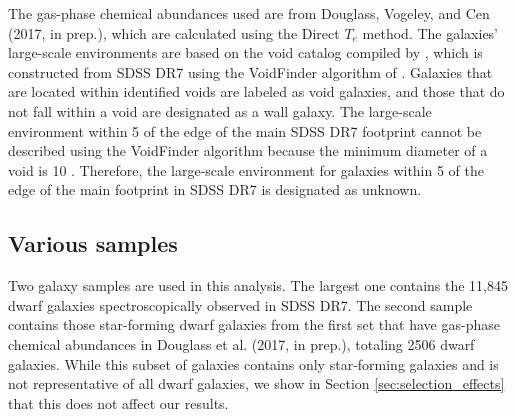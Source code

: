 The gas-phase chemical abundances used are from Douglass, Vogeley, and Cen 
(2017, in prep.), which are calculated using the Direct $T_e$ method.  The 
galaxies' large-scale environments are based on the void catalog compiled by 
\cite{Pan12}, which is constructed from SDSS DR7 using the VoidFinder algorithm 
of \cite{Hoyle02}.  Galaxies that are located within identified voids are 
labeled as void galaxies, and those that do not fall within a void are 
designated as a wall galaxy.  The large-scale environment within 5 \hMpc of the 
edge of the main SDSS DR7 footprint cannot be described using the VoidFinder 
algorithm because the minimum diameter of a void is 10 \hMpc.  Therefore, the 
large-scale environment for galaxies within 5 \hMpc of the edge of the main 
footprint in SDSS DR7 is designated as unknown.



\subsection{Various samples}


Two galaxy samples are used in this analysis.  The largest one contains the 
11,845 dwarf galaxies spectroscopically observed in SDSS DR7.  The second sample 
contains those star-forming dwarf galaxies from the first set that have 
gas-phase chemical abundances in Douglass et al. (2017, in prep.), totaling 2506 
dwarf galaxies.  While this subset of galaxies contains only star-forming 
galaxies and is not representative of all dwarf galaxies, we show in Section 
\ref{sec:selection_effects} that this does not affect our results.


